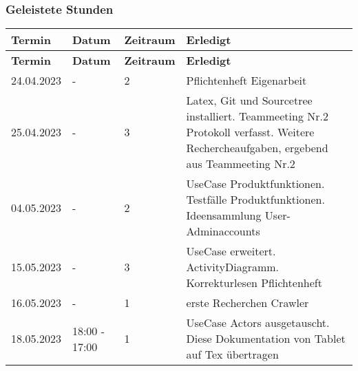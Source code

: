 \subsubsection{Geleistete Stunden}
\begin{flushleft}
		\begin{longtable}{p{2cm}p{}p{2cm}p{}}
            \toprule
            \textbf{Termin} & \textbf{Datum} & \textbf{Zeitraum} & \textbf{Erledigt}\\
            \midrule\endfirsthead
            \toprule
            \textbf{Termin} & \textbf{Datum} & \textbf{Zeitraum} & \textbf{Erledigt}\\
            \midrule\endhead
            	24.04.2023 & - & 2 & Pflichtenheft Eigenarbeit \\ \midrule
				25.04.2023 & - & 3 & Latex, Git und Sourcetree installiert. Teammeeting Nr.2 Protokoll verfasst. Weitere Rechercheaufgaben, ergebend aus Teammeeting Nr.2 \\ \midrule
				04.05.2023 & - & 2 & UseCase Produktfunktionen. Testfälle Produktfunktionen. Ideensammlung User- Adminaccounts \\ \midrule
				15.05.2023 & - & 3 & UseCase erweitert. ActivityDiagramm. Korrekturlesen Pflichtenheft \\ \midrule
				16.05.2023 & - & 1 & erste Recherchen Crawler \\ \midrule
				18.05.2023 & 18:00 - 17:00 & 1 & UseCase Actors ausgetauscht. Diese Dokumentation von Tablet auf Tex übertragen\\ \midrule
            \bottomrule
    \end{longtable}
\end{flushleft}